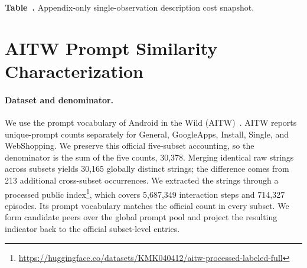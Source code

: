 \begin{center}
  \label{tab:appendix-on-device-cost}
  \small\textbf{Table~\thetable.} Appendix-only single-observation description
  cost snapshot.
  \vspace{0.4em}

\end{center}

\section{AITW Prompt Similarity Characterization}
\label{app:aitw-prompt-similarity}

\paragraph{Dataset and denominator.}
We use the prompt vocabulary of Android in the Wild (AITW)~\cite{rawles2023android}.
AITW reports unique-prompt counts separately for General, GoogleApps, Install,
Single, and WebShopping.  We preserve this official five-subset accounting, so
the denominator is the sum of the five counts, 30,378.  Merging identical raw
strings across subsets yields 30,165 globally distinct strings; the difference
comes from 213 additional cross-subset occurrences.  We extracted the strings
through a processed public index\footnote{\url{https://huggingface.co/datasets/KMK040412/aitw-processed-labeled-full}},
which covers 5,687,349 interaction steps and 714,327 episodes.  Its prompt
vocabulary matches the official count in every subset.  We form candidate
peers over the global prompt pool and project the resulting indicator back to
the official subset-level entries.

